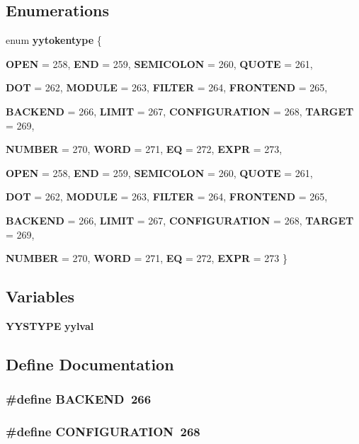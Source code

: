 \subsection*{Enumerations}
\begin{CompactItemize}
\item 
enum {\bf yytokentype} \{ \par
{\bf OPEN} =  258, 
{\bf END} =  259, 
{\bf SEMICOLON} =  260, 
{\bf QUOTE} =  261, 
\par
{\bf DOT} =  262, 
{\bf MODULE} =  263, 
{\bf FILTER} =  264, 
{\bf FRONTEND} =  265, 
\par
{\bf BACKEND} =  266, 
{\bf LIMIT} =  267, 
{\bf CONFIGURATION} =  268, 
{\bf TARGET} =  269, 
\par
{\bf NUMBER} =  270, 
{\bf WORD} =  271, 
{\bf EQ} =  272, 
{\bf EXPR} =  273, 
\par
{\bf OPEN} =  258, 
{\bf END} =  259, 
{\bf SEMICOLON} =  260, 
{\bf QUOTE} =  261, 
\par
{\bf DOT} =  262, 
{\bf MODULE} =  263, 
{\bf FILTER} =  264, 
{\bf FRONTEND} =  265, 
\par
{\bf BACKEND} =  266, 
{\bf LIMIT} =  267, 
{\bf CONFIGURATION} =  268, 
{\bf TARGET} =  269, 
\par
{\bf NUMBER} =  270, 
{\bf WORD} =  271, 
{\bf EQ} =  272, 
{\bf EXPR} =  273
 \}
\end{CompactItemize}
\subsection*{Variables}
\begin{CompactItemize}
\item 
{\bf YYSTYPE} {\bf yylval}
\end{CompactItemize}


\subsection{Define Documentation}
\subsubsection[{BACKEND}]{\setlength{\rightskip}{0pt plus 5cm}\#define BACKEND~266}\label{rules_8h_d1a818a856755d7465f573663feeb786}


\subsubsection[{CONFIGURATION}]{\setlength{\rightskip}{0pt plus 5cm}\#define CONFIGURATION~268}\label{rules_8h_5fa120064b78d91b6a77f868bbda5a99}


